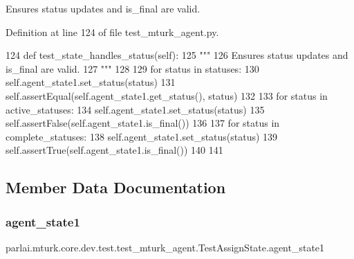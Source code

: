 \begin{DoxyVerb}Ensures status updates and is_final are valid.
\end{DoxyVerb}
 

Definition at line 124 of file test\+\_\+mturk\+\_\+agent.\+py.


\begin{DoxyCode}
124     \textcolor{keyword}{def }test\_state\_handles\_status(self):
125         \textcolor{stringliteral}{"""}
126 \textcolor{stringliteral}{        Ensures status updates and is\_final are valid.}
127 \textcolor{stringliteral}{        """}
128 
129         \textcolor{keywordflow}{for} status \textcolor{keywordflow}{in} statuses:
130             self.agent\_state1.set\_status(status)
131             self.assertEqual(self.agent\_state1.get\_status(), status)
132 
133         \textcolor{keywordflow}{for} status \textcolor{keywordflow}{in} active\_statuses:
134             self.agent\_state1.set\_status(status)
135             self.assertFalse(self.agent\_state1.is\_final())
136 
137         \textcolor{keywordflow}{for} status \textcolor{keywordflow}{in} complete\_statuses:
138             self.agent\_state1.set\_status(status)
139             self.assertTrue(self.agent\_state1.is\_final())
140 
141 
\end{DoxyCode}


\subsection{Member Data Documentation}
\mbox{\label{classparlai_1_1mturk_1_1core_1_1dev_1_1test_1_1test__mturk__agent_1_1TestAssignState_a589853e9394873d6856deb229b18082a}} 
\subsubsection{\texorpdfstring{agent\+\_\+state1}{agent\_state1}}
{\footnotesize\ttfamily parlai.\+mturk.\+core.\+dev.\+test.\+test\+\_\+mturk\+\_\+agent.\+Test\+Assign\+State.\+agent\+\_\+state1}



